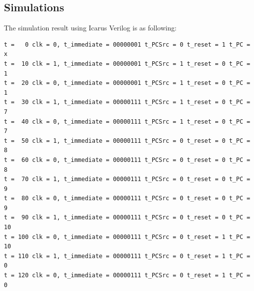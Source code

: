 \documentclass{article}
\begin{document}
\subsection{Simulations}
The simulation result using Icarus Verilog is as following:
\begin{Verbatim}
t =   0 clk = 0, t_immediate = 00000001 t_PCSrc = 0 t_reset = 1 t_PC =   x
t =  10 clk = 1, t_immediate = 00000001 t_PCSrc = 1 t_reset = 0 t_PC =   1
t =  20 clk = 0, t_immediate = 00000001 t_PCSrc = 1 t_reset = 0 t_PC =   1
t =  30 clk = 1, t_immediate = 00000111 t_PCSrc = 1 t_reset = 0 t_PC =   7
t =  40 clk = 0, t_immediate = 00000111 t_PCSrc = 1 t_reset = 0 t_PC =   7
t =  50 clk = 1, t_immediate = 00000111 t_PCSrc = 0 t_reset = 0 t_PC =   8
t =  60 clk = 0, t_immediate = 00000111 t_PCSrc = 0 t_reset = 0 t_PC =   8
t =  70 clk = 1, t_immediate = 00000111 t_PCSrc = 0 t_reset = 0 t_PC =   9
t =  80 clk = 0, t_immediate = 00000111 t_PCSrc = 0 t_reset = 0 t_PC =   9
t =  90 clk = 1, t_immediate = 00000111 t_PCSrc = 0 t_reset = 0 t_PC =  10
t = 100 clk = 0, t_immediate = 00000111 t_PCSrc = 0 t_reset = 1 t_PC =  10
t = 110 clk = 1, t_immediate = 00000111 t_PCSrc = 0 t_reset = 1 t_PC =   0
t = 120 clk = 0, t_immediate = 00000111 t_PCSrc = 0 t_reset = 1 t_PC =   0
\end{Verbatim}
\end{document}
